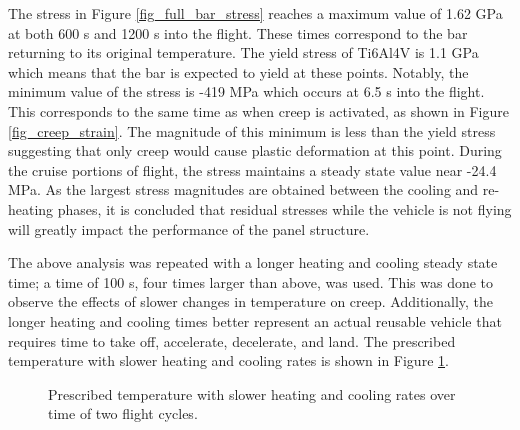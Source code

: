 \documentclass[conf]{new-aiaa}
\begin{document}
The stress in Figure \ref{fig_full_bar_stress} reaches a maximum value of 
1.62 GPa at both 600 s and 1200 s into the flight. 
These times correspond to the bar returning to its original temperature.
The yield stress of Ti6Al4V is 1.1 GPa 
\cite{boyer_materials_properties_handbook_titanium_alloys}
which means that the bar is expected to yield at these points.
Notably, the minimum value of the stress is -419 MPa 
which occurs at 6.5 s into the flight. 
This corresponds to the same time as when creep is activated,
as shown in Figure \ref{fig_creep_strain}.
The magnitude of this minimum is less than the yield 
stress suggesting that only creep would cause plastic deformation
at this point.
During the cruise portions of flight, the stress
maintains a steady state value near -24.4 MPa.
As the largest stress magnitudes are obtained between the cooling
and re-heating phases,
it is concluded that residual stresses while the vehicle is not
flying will greatly impact the performance of the panel structure.

The above analysis was repeated with a longer heating and cooling 
steady state time;
a time of 100 s, four times larger than above, was used.
This was done to observe the effects of slower
changes in temperature on creep.
Additionally, the longer heating and cooling times
better represent an actual reusable vehicle that requires
time to take off, accelerate, decelerate, and land.
The prescribed temperature with slower
heating and cooling rates is shown in Figure \ref{fig_slow_bar_temperature}.

\begin{figure}[H]
  \centering
  \caption{ Prescribed temperature with slower 
            heating and cooling rates over time of two flight cycles.}
  \label{fig_slow_bar_temperature}
\end{figure}
\end{document}
